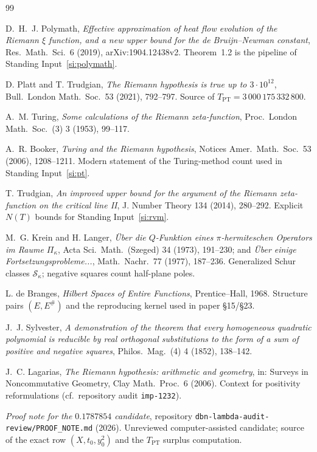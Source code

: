 \documentclass[11pt]{article}
\theoremstyle{definition}
\theoremstyle{remark}
\newcommand{\TPT}{T_{\mathrm{PT}}}
\begin{document}
\begin{thebibliography}{99}

 D.~H.~J. Polymath, \emph{Effective approximation of heat
flow evolution of the Riemann $\xi$ function, and a new upper bound for the
de Bruijn--Newman constant}, Res.\ Math.\ Sci.\ 6 (2019), arXiv:1904.12438v2.
Theorem~1.2 is the pipeline of Standing Input~\ref{si:polymath}.

 D. Platt and T. Trudgian, \emph{The Riemann
hypothesis is true up to $3\cdot10^{12}$}, Bull.\ London Math.\ Soc.\ 53
(2021), 792--797. Source of $\TPT=3\,000\,175\,332\,800$.

 A.~M. Turing, \emph{Some calculations of the Riemann
zeta-function}, Proc.\ London Math.\ Soc.\ (3) 3 (1953), 99--117.

 A.~R. Booker, \emph{Turing and the Riemann hypothesis},
Notices Amer.\ Math.\ Soc.\ 53 (2006), 1208--1211. Modern statement of the
Turing-method count used in Standing Input~\ref{si:pt}.

 T. Trudgian, \emph{An improved upper bound for the
argument of the Riemann zeta-function on the critical line II}, J. Number
Theory 134 (2014), 280--292. Explicit $N(T)$ bounds for Standing
Input~\ref{si:rvm}.

 M.~G. Krein and H. Langer, \emph{\"Uber die
$Q$-Funktion eines $\pi$-hermiteschen Operators im Raume $\Pi_\kappa$},
Acta Sci.\ Math.\ (Szeged) 34 (1973), 191--230; and \emph{\"Uber einige
Fortsetzungsprobleme...}, Math.\ Nachr.\ 77 (1977), 187--236. Generalized
Schur classes $\mathcal{S}_\kappa$; negative squares count half-plane poles.

 L. de Branges, \emph{Hilbert Spaces of Entire
Functions}, Prentice--Hall, 1968. Structure pairs $(E,E^{\#})$ and the
reproducing kernel used in paper \S15/\S23.

 J.~J. Sylvester, \emph{A demonstration of the theorem
that every homogeneous quadratic polynomial is reducible by real orthogonal
substitutions to the form of a sum of positive and negative squares},
Philos.\ Mag.\ (4) 4 (1852), 138--142.

 J.~C. Lagarias, \emph{The Riemann hypothesis: arithmetic
and geometry}, in: Surveys in Noncommutative Geometry, Clay Math.\ Proc.\ 6
(2006). Context for positivity reformulations (cf.\ repository audit
\texttt{imp-1232}).

 \emph{Proof note for the $0.1787854$ candidate},
repository \texttt{dbn-lambda-audit-review/PROOF\_NOTE.md} (2026).
Unreviewed computer-assisted candidate; source of the exact row
$(X,t_0,y_0^2)$ and the $T_{\mathrm{PT}}$ surplus computation.


\end{thebibliography}
\end{document}
